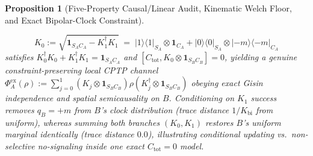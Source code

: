 \documentclass[11pt,a4paper]{article}
\newtheorem{proposition}{Proposition}
\theoremstyle{definition}
\theoremstyle{remark}
\newcommand{\1}{\mathbf{1}}
\begin{document}
\begin{proposition}[Five-Property Causal/Linear Audit, Kinematic Welch Floor, and Exact Bipolar-Clock Constraint]
\begin{enumerate}
\begin{enumerate}
    \begin{equation}\label{eq:bipolar-cptp}
      K_0 := \sqrt{\1_{S_A C_A} - K_1^\dagger K_1}
      \;=\; |1\rangle\langle 1|_{S_A}\otimes\1_{C_A} + |0\rangle\langle 0|_{S_A}\otimes|-m\rangle\langle -m|_{C_A}
    \end{equation}
    satisfies $K_0^\dagger K_0 + K_1^\dagger K_1 = \1_{S_A C_A}$ and $[C_{\mathrm{tot}},K_0\otimes\1_{S_B C_B}]=0$, yielding a genuine constraint-preserving local CPTP channel $\Phi_A^{\mathrm{ex}}(\rho):=\sum_{j=0}^1(K_j\otimes\1_{S_B C_B})\rho(K_j^\dagger\otimes\1_{S_B C_B})$ obeying exact Gisin independence and spatial semicausality on $B$. Conditioning on $K_1$ success removes $q_B=+m$ from $B$'s clock distribution (trace distance $1/K_{\mathrm{bi}}$ from uniform), whereas summing both branches $(K_0,K_1)$ restores $B$'s uniform marginal identically (trace distance $0.0$), illustrating conditional updating vs.\ non-selective no-signaling inside one exact $C_{\mathrm{tot}}=0$ model.
  \end{enumerate}
\end{enumerate}
\end{proposition}
\end{document}
